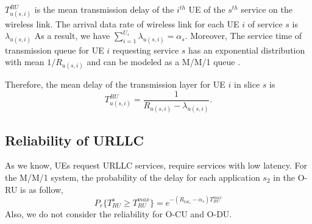 \documentclass[conference]{IEEEtran}
\begin{document}
$T_{u(s,i)}^{RU}$ is the mean transmission delay of the $i^{th}$ UE of the $s^{th}$ service on the wireless link.
 The arrival data rate of wireless link for each UE $i$ of service $s$ is $\lambda_{u(s,i)}$
As a result, we have $\sum_{i = 1}^{U_s} \lambda_{u(s,i)} = \alpha_s$.
Moreover, The service time of transmission queue for UE $i$ requesting service $s$ has
an exponential distribution with mean $1/R_{u(s,i)}$ and can be modeled as a M/M/1 queue \cite{SystemCostMinimization,luong2018joint,luong2018novel}.
 
Therefore, the mean delay of the transmission layer for UE $i$ in slice $s$ is
\begin{equation}
 T_{u(s,i)}^{RU} = \frac{1}{R_{u(s,i)} - \lambda_{u(s,i)}}.
\end{equation}

\subsection{Reliability of URLLC}
As we know, UEs request URLLC services, require services with low latency.
For the M/M/1 system, the probability of the delay for each application $s_2$ in the O-RU is as follow, 
\begin{equation}
P_r\{T_{RU}^{s} \geq T_{RU}^{max}\} = e^{-(R_{{tot}_s} - \alpha_{s})T_{RU}^{max}}
\end{equation} 
Also, we do not consider the reliability for O-CU and O-DU.
\end{document}
